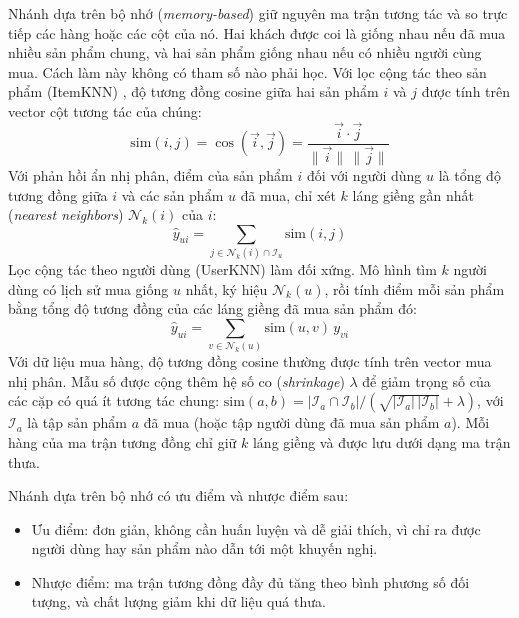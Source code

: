 Nhánh dựa trên bộ nhớ (\textit{memory-based}) giữ nguyên ma trận tương tác và so trực tiếp các hàng hoặc các cột của nó. Hai khách được coi là giống nhau nếu đã mua nhiều sản phẩm chung, và hai sản phẩm giống nhau nếu có nhiều người cùng mua. Cách làm này không có tham số nào phải học. Với lọc cộng tác theo sản phẩm (ItemKNN) \parencite{sarwar2001item}, độ tương đồng cosine giữa hai sản phẩm $i$ và $j$ được tính trên vector cột tương tác của chúng:
\begin{equation*}
    \text{sim}(i, j) = \cos(\vec{i}, \vec{j}) = \frac{\vec{i} \cdot \vec{j}}{\lVert \vec{i} \rVert \, \lVert \vec{j} \rVert}
\end{equation*}
Với phản hồi ẩn nhị phân, điểm của sản phẩm $i$ đối với người dùng $u$ là tổng độ tương đồng giữa $i$ và các sản phẩm $u$ đã mua, chỉ xét $k$ láng giềng gần nhất (\textit{nearest neighbors}) $\mathcal{N}_k(i)$ của $i$:
\begin{equation*}
    \hat{y}_{ui} = \sum_{j \in \mathcal{N}_k(i) \cap \mathcal{I}_u} \text{sim}(i, j)
\end{equation*}
Lọc cộng tác theo người dùng (UserKNN) làm đối xứng. Mô hình tìm $k$ người dùng có lịch sử mua giống $u$ nhất, ký hiệu $\mathcal{N}_k(u)$, rồi tính điểm mỗi sản phẩm bằng tổng độ tương đồng của các láng giềng đã mua sản phẩm đó:
\begin{equation*}
    \hat{y}_{ui} = \sum_{v \in \mathcal{N}_k(u)} \text{sim}(u, v)\, y_{vi}
\end{equation*}
Với dữ liệu mua hàng, độ tương đồng cosine thường được tính trên vector mua nhị phân. Mẫu số được cộng thêm hệ số co (\textit{shrinkage}) $\lambda$ để giảm trọng số của các cặp có quá ít tương tác chung: $\text{sim}(a, b) = |\mathcal{I}_a \cap \mathcal{I}_b| / (\sqrt{|\mathcal{I}_a|\,|\mathcal{I}_b|} + \lambda)$, với $\mathcal{I}_a$ là tập sản phẩm $a$ đã mua (hoặc tập người dùng đã mua sản phẩm $a$). Mỗi hàng của ma trận tương đồng chỉ giữ $k$ láng giềng và được lưu dưới dạng ma trận thưa.

Nhánh dựa trên bộ nhớ có ưu điểm và nhược điểm sau:
\begin{itemize}
    \item Ưu điểm: đơn giản, không cần huấn luyện và dễ giải thích, vì chỉ ra được người dùng hay sản phẩm nào dẫn tới một khuyến nghị.
    \item Nhược điểm: ma trận tương đồng đầy đủ tăng theo bình phương số đối tượng, và chất lượng giảm khi dữ liệu quá thưa.
\end{itemize}

